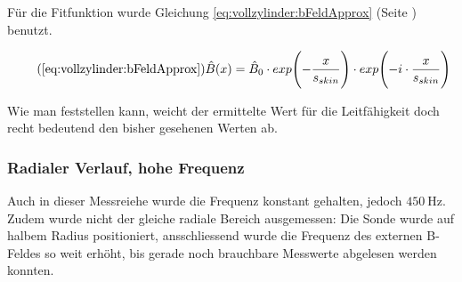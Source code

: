 {\begin{minipage}[t]{0.33\textwidth}
        F\"ur               die                Fitfunktion               wurde
        Gleichung           \ref{eq:vollzylinder:bFeldApprox}           (Seite
        \pageref{eq:vollzylinder:bFeldApprox}) benutzt.

        \begin{equation}
            \tag{\ref{eq:vollzylinder:bFeldApprox}}
            \hat{B} (x) = \hat{B}_0 \cdot exp\Biggl(-\frac{x}{s_{skin}} \Biggr) \cdot exp\Biggl(-i \cdot \frac{x}{s_{skin}} \Biggr)
        \end{equation}

        

        \vspace{0.5em}

        Wie  man  feststellen  kann,  weicht der  ermittelte  Wert  f\"ur  die
        Leitf\"ahigkeit doch recht bedeutend den bisher gesehenen Werten ab.
	\end{minipage}%
	\begin{minipage}[t]{0.67\textwidth}
        \vspace{0mm}
        \hfill
        \resizebox{.95\textwidth}{!}{}
        \label{fig:alu:rad:approx:low}
	\end{minipage}


    \subsubsection{Radialer Verlauf, hohe Frequenz}
    \label{sec:ausw:subsec:vollz:subsubsec:highfreq}

	\begin{minipage}[t]{0.33\textwidth}
        \vspace{0mm}
        Auch  in  dieser  Messreiehe  wurde die  Frequenz  konstant  gehalten,
        jedoch  $\SI{450}{\hertz}$. Zudem  wurde  nicht  der  gleiche  radiale
        Bereich ausgemessen: Die  Sonde wurde auf halbem  Radius positioniert,
        ansschliessend  wurde  die  Frequenz  des externen  B-Feldes  so  weit
        erh\"oht,  bis  gerade  noch  brauchbare  Messwerte  abgelesen  werden
        konnten.


\end{minipage}}
